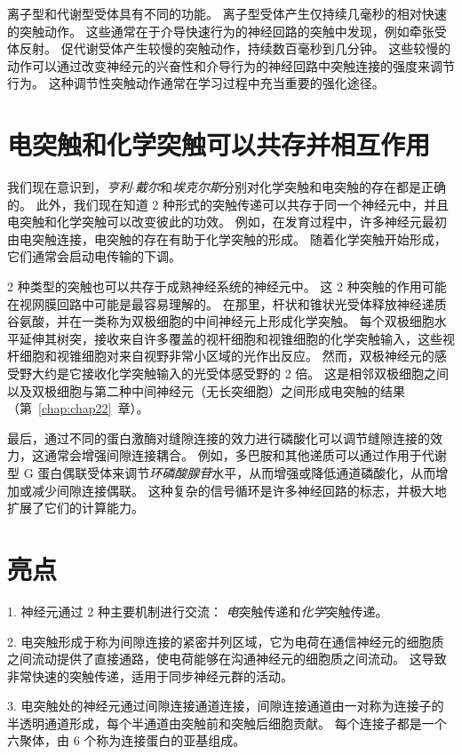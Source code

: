 离子型和代谢型受体具有不同的功能。
离子型受体产生仅持续几毫秒的相对快速的突触动作。
这些通常在于介导快速行为的神经回路的突触中发现，例如牵张受体反射。
促代谢受体产生较慢的突触动作，持续数百毫秒到几分钟。
这些较慢的动作可以通过改变神经元的兴奋性和介导行为的神经回路中突触连接的强度来调节行为。
这种调节性突触动作通常在学习过程中充当重要的强化途径。




\section{电突触和化学突触可以共存并相互作用}

我们现在意识到，\textit{亨利$\cdot$戴尔}和\textit{埃克尔斯}分别对化学突触和电突触的存在都是正确的。
此外，我们现在知道 2 种形式的突触传递可以共存于同一个神经元中，并且电突触和化学突触可以改变彼此的功效。
例如，在发育过程中，许多神经元最初由电突触连接，电突触的存在有助于化学突触的形成。
随着化学突触开始形成，它们通常会启动电传输的下调。


2 种类型的突触也可以共存于成熟神经系统的神经元中。
这 2 种突触的作用可能在视网膜回路中可能是最容易理解的。
在那里，杆状和锥状光受体释放神经递质谷氨酸，并在一类称为双极细胞的中间神经元上形成化学突触。
每个双极细胞水平延伸其树突，接收来自许多覆盖的视杆细胞和视锥细胞的化学突触输入，这些视杆细胞和视锥细胞对来自视野非常小区域的光作出反应。
然而，双极神经元的感受野大约是它接收化学突触输入的光受体感受野的 2 倍。
这是相邻双极细胞之间以及双极细胞与第二种中间神经元（无长突细胞）之间形成电突触的结果（第~\ref{chap:chap22}~章）。


最后，通过不同的蛋白激酶对缝隙连接的效力进行磷酸化可以调节缝隙连接的效力，这通常会增强间隙连接耦合。
例如，多巴胺和其他递质可以通过作用于代谢型 G 蛋白偶联受体来调节\textit{环磷酸腺苷}水平，从而增强或降低通道磷酸化，从而增加或减少间隙连接偶联。
这种复杂的信号循环是许多神经回路的标志，并极大地扩展了它们的计算能力。



\section{亮点}

1. 神经元通过 2 种主要机制进行交流：
\textit{电}突触传递和\textit{化学}突触传递。


2. 电突触形成于称为间隙连接的紧密并列区域，它为电荷在通信神经元的细胞质之间流动提供了直接通路，使电荷能够在沟通神经元的细胞质之间流动。
这导致非常快速的突触传递，适用于同步神经元群的活动。 


3. 电突触处的神经元通过间隙连接通道连接，间隙连接通道由一对称为连接子的半透明通道形成，每个半通道由突触前和突触后细胞贡献。
每个连接子都是一个六聚体，由 6 个称为连接蛋白的亚基组成。


